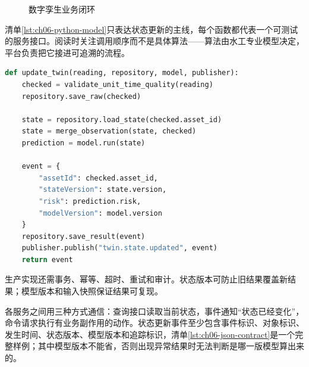 \begin{figure}[htbp]
\centering
{}
\caption{数字孪生业务闭环}
\label{fig:dt-closed-loop}
\end{figure}

清单\ref{lst:ch06-python-model}只表达状态更新的主线，每个函数都代表一个可测试的服务接口。阅读时关注调用顺序而不是具体算法——算法由水工专业模型决定，平台负责把它接进可追溯的流程。

\begin{lstlisting}[label={lst:ch06-python-model},language=Python,caption={数字孪生模型计算接口}]
def update_twin(reading, repository, model, publisher):
    checked = validate_unit_time_quality(reading)
    repository.save_raw(checked)

    state = repository.load_state(checked.asset_id)
    state = merge_observation(state, checked)
    prediction = model.run(state)

    event = {
        "assetId": checked.asset_id,
        "stateVersion": state.version,
        "risk": prediction.risk,
        "modelVersion": model.version
    }
    repository.save_result(event)
    publisher.publish("twin.state.updated", event)
    return event
\end{lstlisting}

生产实现还需事务、幂等、超时、重试和审计。状态版本可防止旧结果覆盖新结果；模型版本和输入快照保证结果可复现。

各服务之间用三种方式通信：查询接口读取当前状态，事件通知“状态已经变化”，命令请求执行有业务副作用的动作。状态更新事件至少包含事件标识、对象标识、发生时间、状态版本、模型版本和追踪标识，清单\ref{lst:ch06-json-contract}是一个完整样例；其中模型版本不能省，否则出现异常结果时无法判断是哪一版模型算出来的。

